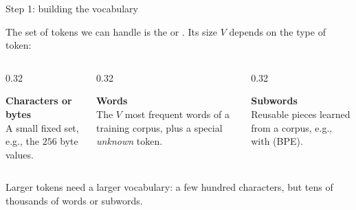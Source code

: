 \begin{frame}{Step 1: building the vocabulary}
    \setlength{\parskip}{4pt}

    The set of tokens we can handle is the  or
    . Its size $V$ depends on the type of token:

    \medskip
    \begin{columns}[T,onlytextwidth]
        \begin{column}{0.32\textwidth}
            \begin{tcolorbox}[nndsblue,courseheight={text-vocab}{}]
                \textbf{Characters or bytes}\\
                A small fixed set, e.g., the $256$ byte values.
            \end{tcolorbox}
        \end{column}
        \begin{column}{0.32\textwidth}
            \begin{tcolorbox}[nndsred,courseheight={text-vocab}{}]
                \textbf{Words}\\
                The $V$ most frequent words of a training corpus, plus a
                special \textit{unknown} token.
            \end{tcolorbox}
        \end{column}
        \begin{column}{0.32\textwidth}
            \begin{tcolorbox}[nndsgreen,courseheight={text-vocab}{}]
                \textbf{Subwords}\\
                Reusable pieces learned from a corpus, e.g., with
                 (BPE).
            \end{tcolorbox}
        \end{column}
    \end{columns}

    \medskip
    Larger tokens need a larger vocabulary: a few hundred characters, but
    tens of thousands of words or subwords.

\end{frame}

